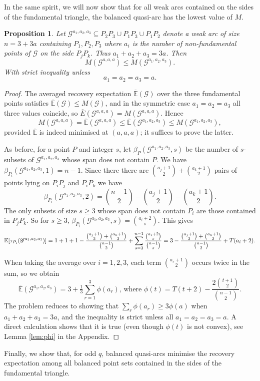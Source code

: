 \documentclass{article}
\newtheorem{proposition}{Proposition}
\newcommand{\Gscr}{\mathscr{G}}
\newcommand{\E}{\mathbb{E}}
\begin{document}
In the same spirit, we will now show that for all weak arcs contained on the sides of the fundamental triangle, the balanced quasi-arc has the lowest value of $M$.

\begin{proposition}
\label{prop:balbetter}
Let $
\Gscr^{a_1,a_2,a_3}\subseteq P_2P_3\cup P_1P_3\cup P_1P_2$ 
denote a weak arc of size $n=3+3a$ containing $P_1,P_2,P_3$ where $a_i$ is the number of non-fundamental points of
$\Gscr$ on the side $P_jP_k$. Thus $a_1+a_2+a_3=3a$.
 Then
\[
M(\Gscr^{a,a,a})\le M(\Gscr^{a_1,a_2,a_3}).
\]
With strict inequality unless
\[
a_1=a_2=a_3=a.
\]
\end{proposition}


\begin{proof}
The averaged recovery expectation $\overline{\E}(\Gscr)$ over the three fundamental points satisfies
$\overline{\E}(\Gscr)\le M(\Gscr)$, and in the symmetric case $a_1=a_2=a_3$ all three values
coincide, so $\overline{E}(\Gscr^{a,a,a})=M(\Gscr^{a,a,a})$. Hence
\[
M(\Gscr^{a,a,a})=\overline{\E}(\Gscr^{a,a,a})
\le\overline{\E}(\Gscr^{a_1,a_2,a_3})
\le M(\Gscr^{a_1,a_2,a_3}),
\]
provided $\overline{\E}$ is indeed minimised at $(a,a,a)$; it suffices to prove the latter.

As before, for a point $P$ and integer $s$, let
$\beta_P(\Gscr^{a_1,a_2,a_3},s)$ be the number of $s$-subsets of $\Gscr^{a_1,a_2,a_3}$ whose span does not contain $P$. We have $
\beta_{P_i}(\Gscr^{a_1,a_2,a_3},1)=n-1$.
Since there there are $\binom{a_j+1}{2}+\binom{a_k+1}{2}$ pairs of points lying on $P_iP_j$ and $P_iP_k$ we have
\[
\beta_{P_i}(\Gscr^{a_1,a_2,a_3},2)=\binom{n-1}{2}-\binom{a_j+1}{2}-\binom{a_k+1}{2}.
\]
The only subsets of size $s\ge3$ whose span does not contain $P_i$ are those contained in $P_jP_k$. So for $s\geq 3$, $\beta_{P_i}(\Gscr^{a_1,a_2,a_3},s)=\binom{a_i+2}{s}$.
This gives
\[
\E[\tau_{P_i}(\Gscr^{a_1,a_2,a_3})]
=1+1+1-\frac{\binom{a_j+1}{2}+\binom{a_k+1}{2}}{\binom{n-1}{2}}
+\sum_{s=3}^{n-1}\frac{\binom{a_i+2}{s}}{\binom{n-1}{s}}\\=3-\frac{\binom{a_j+1}{2}+\binom{a_k+1}{2}}{\binom{n-1}{2}}
+T(a_i+2).
\]

When taking the average over $i=1,2,3$, each term $\binom{a_r+1}{2}$ occurs twice in the sum, so we
obtain
\[
\overline{\E}(\Gscr^{a_1,a_2,a_3})=3+\tfrac13\sum_{r=1}^{3}\phi(a_r)
\text{, where }
\phi(t)=T(t+2)-\frac{2\binom{t+1}{2}}{\binom{n-1}{2}}.
\]
The problem reduces to showing that
$\sum_{r}\phi(a_r)\ge3\phi(a)$ when $a_1+a_2+a_3=3a$, and the inequality is strict unless all $a_1=a_2=a_3=a$.
A direct calculation shows that it is true (even though $\phi(t)$ is not convex), see Lemma \ref{lem:phi} in the Appendix.



\end{proof}
Finally, we show that, for odd $q$, balanced quasi-arcs minimise the recovery expectation among all balanced point sets contained in the sides of the fundamental triangle.
\end{document}
